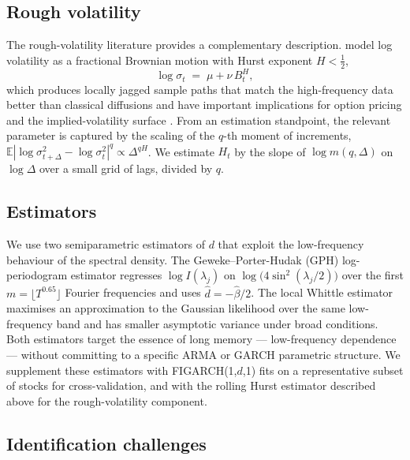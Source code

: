 \documentclass[11pt,a4paper]{article}
\newcommand{\E}{\mathbb{E}}
\newcommand{\dhat}{\hat d}
\begin{document}
\subsection{Rough volatility}

The rough-volatility literature provides a complementary description.
\citet{gatheral2018volatility} model log volatility as a fractional
Brownian motion with Hurst exponent $H<\tfrac12$,
\begin{equation}
  \log \sigma_t \;=\; \mu + \nu\, B^H_t,
\end{equation}
which produces locally jagged sample paths that match the
high-frequency data better than classical diffusions and have important
implications for option pricing and the implied-volatility surface
\citep{bennedsen2021decoupling}. From an estimation standpoint, the
relevant parameter is captured by the scaling of the $q$-th moment of
increments,
$\E|\log\sigma_{t+\Delta}^2-\log\sigma_t^2|^q \propto \Delta^{qH}$.
We estimate $H_t$ by the slope of $\log m(q,\Delta)$ on $\log\Delta$ over
a small grid of lags, divided by $q$.

\subsection{Estimators}

We use two semiparametric estimators of $d$ that exploit the low-frequency
behaviour of the spectral density. The Geweke--Porter-Hudak (GPH)
log-periodogram estimator \citep{geweke1983estimation} regresses
$\log I(\lambda_j)$ on $\log\bigl(4\sin^2(\lambda_j/2)\bigr)$ over the
first $m=\lfloor T^{0.65}\rfloor$ Fourier frequencies and uses
$\dhat = -\hat\beta/2$. The local Whittle estimator
\citep{robinson1995gaussian} maximises an approximation to the Gaussian
likelihood over the same low-frequency band and has smaller asymptotic
variance under broad conditions. Both estimators target the essence of
long memory --- low-frequency dependence --- without committing to a
specific ARMA or GARCH parametric structure. We supplement these
estimators with FIGARCH(1,$d$,1) fits on a representative subset of stocks
for cross-validation, and with the rolling Hurst estimator described
above for the rough-volatility component.

\subsection{Identification challenges}
\end{document}

